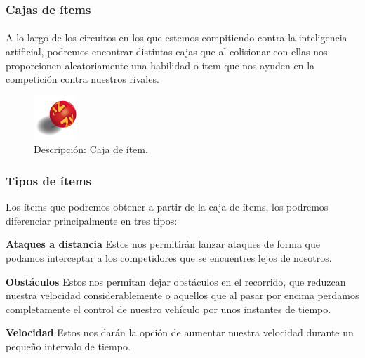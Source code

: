 \subsubsection{Cajas de ítems} 

\paragraph{}
A lo largo de los circuitos en los que estemos compitiendo contra la inteligencia artificial, 
podremos encontrar distintas cajas que al colisionar con ellas nos proporcionen
aleatoriamente una habilidad o ítem que nos
ayuden en la competición contra nuestros rivales.

\begin{figure}[H]
	\label{item_box}
	\begin{center}
		\includegraphics[scale=1]{imagenes/items/item_box.png}
	\end{center}
	\caption{Descripción: Caja de ítem.}
\end{figure}

\subsubsection{Tipos de ítems}

Los ítems que podremos obtener a partir de la caja de ítems, los podremos diferenciar principalmente en tres tipos:

\begin{description}
	\item \textbf{Ataques a distancia} Estos nos permitirán lanzar ataques
        de forma que podamos interceptar a los competidores que 
	se encuentres lejos de nosotros.
	
	\item \textbf{Obstáculos} Estos nos permitan dejar obstáculos en el
        recorrido, que reduzcan nuestra velocidad considerablemente
	o aquellos que al pasar por encima perdamos completamente el control de nuestro vehículo por unos instantes de tiempo.
	
	\item \textbf{Velocidad} Estos nos darán la opción de aumentar nuestra velocidad durante un pequeño intervalo de tiempo.
\end{description}

